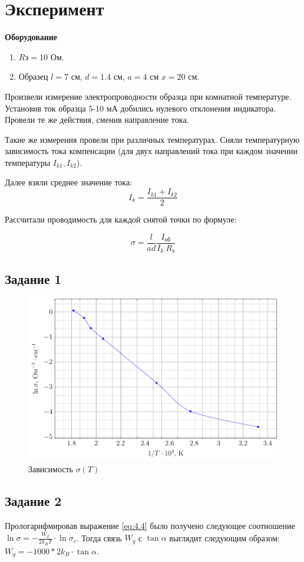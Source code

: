 \section* {Эксперимент}
\textbf{Оборудование}
\begin{enumerate}
	\item $R{\text{э}} = 10$ Ом.
	\item Образец $l = 7$ см, $d=1.4$ см, $a = 4$ см $x = 20$ см.
\end{enumerate}

Произвели измерение электропроводности образца при комнатной температуре. Установив ток образца 5-10 мА
добились нулевого отклонения индикатора. Провели те же действия, сменив направление тока.

Такие же измерения провели при различных температурах. Сняли температурную зависимость тока компенсации (для двух направлений тока при каждом
значении температуры $I_{k1},I_{k2}$).

Далее взяли среднее значение тока:
$$I_k=\frac{I_{k1}+I_{k2}}{2}$$

Рассчитали проводимость для каждой снятой точки по формуле:

$$\sigma = \frac{l}{ad} \frac{I_{\text{об}}}{ I_k ~ R_{\text{э}}}$$

\subsection*{Задание 1}
\begin{figure}[H]
	\centering
	\includegraphics[width=0.8\linewidth]{plots/fig1.pdf}
	\caption{Зависимость $\sigma(T)$}
	\label{fig:exp.1}
\end{figure}

\subsection*{Задание 2}
Прологарифмировав выражение \eqref{eq:4.4} было получено следующее соотношение $\displaystyle\ln\sigma = -\frac{W_g}{2k_BT}\cdot\ln\sigma_c$. Тогда связь $W_g$ с $\tan\alpha$ выглядит следующим образом: $W_g = -1000*2k_B\cdot\tan\alpha$. %

